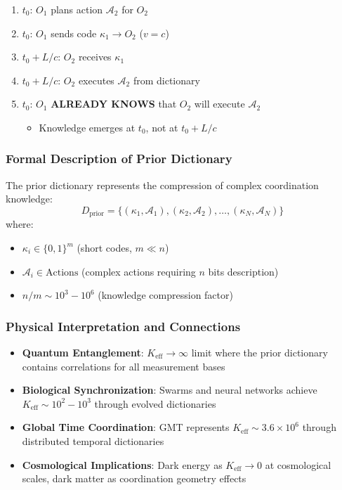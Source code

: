 \documentclass[11pt,a4paper]{article}
\begin{document}
	\begin{enumerate}[label=\arabic*.]
		\item $t_0$: $O_1$ plans action $\mathcal{A}_2$ for $O_2$
		\item $t_0$: $O_1$ sends code $\kappa_1 \to O_2$ ($v = c$)
		\item $t_0 + L/c$: $O_2$ receives $\kappa_1$
		\item $t_0 + L/c$: $O_2$ executes $\mathcal{A}_2$ from dictionary
		\item $t_0$: $O_1$ \textbf{ALREADY KNOWS} that $O_2$ will execute $\mathcal{A}_2$
		\begin{itemize}
			\item Knowledge emerges at $t_0$, not at $t_0 + L/c$
		\end{itemize}
	\end{enumerate}
	
	\subsubsection{Formal Description of Prior Dictionary}
	
	The prior dictionary represents the compression of complex coordination knowledge:
	\begin{equation}
		D_{\text{prior}} = \{(\kappa_1, \mathcal{A}_1), (\kappa_2, \mathcal{A}_2), \dots, (\kappa_N, \mathcal{A}_N)\}
	\end{equation}
	where:
	\begin{itemize}
		\item $\kappa_i \in \{0,1\}^m$ (short codes, $m \ll n$)
		\item $\mathcal{A}_i \in \text{Actions}$ (complex actions requiring $n$ bits description)
		\item $n/m \sim 10^3-10^6$ (knowledge compression factor)
	\end{itemize}
	
	\subsubsection{Physical Interpretation and Connections}
	
	\begin{itemize}
		\item \textbf{Quantum Entanglement}: $K_{\mathrm{eff}} \to \infty$ limit where the prior dictionary contains correlations for all measurement bases
		
		\item \textbf{Biological Synchronization}: Swarms and neural networks achieve $K_{\mathrm{eff}} \sim 10^2-10^3$ through evolved dictionaries
		
		\item \textbf{Global Time Coordination}: GMT represents $K_{\mathrm{eff}} \sim 3.6\times10^6$ through distributed temporal dictionaries
		
		\item \textbf{Cosmological Implications}: Dark energy as $K_{\mathrm{eff}} \to 0$ at cosmological scales, dark matter as coordination geometry effects
	\end{itemize}
	
\end{document}
